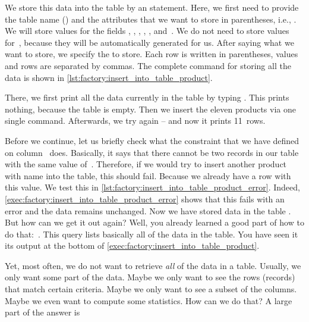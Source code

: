 We store this data into the table  by an  statement.
Here, we first need to provide the table name () and the attributes that we want to store in parentheses, i.e., .
We will store values for the fields , , , , , and~.
We do not need to store values for~, because they will be automatically generated for us.
After saying what we want to store, we specify the  to store.
Each row is written in parentheses, values and rows are separated by commas.
The complete command for storing all the data is shown in \cref{lst:factory:insert_into_table_product}.

There, we first print all the data currently in the table by typing \sqlIdx{*}.
This prints nothing, because the table is empty.
Then we insert the eleven products via one single  command.
Afterwards, we try \sqlIdx{*} again -- and now it prints 11~rows.

Before we continue, let us briefly check what the  constraint that we have defined on column~ does.
Basically, it says that there cannot be two records in our table with the same value of~.
Therefore, if we would try to insert another product with name  into the table, this should fail.
Because we already have a row with this value.
We test this in \cref{lst:factory:insert_into_table_product_error}.
Indeed, \cref{exec:factory:insert_into_table_product_error} shows that this fails with an error and the data remains unchanged.%
%
\endhsection%
%
%
%
Now we have stored data in the table .
But how can we get it out again?
Well, you already learned a good part of how to do that:~\sqlIdx{*}.
This query lists basically all of the data in the table.
You have seen it its output at the bottom of \cref{exec:factory:insert_into_table_product}.

Yet, most often, we do not want to retrieve \emph{all} of the data in a table.
Usually, we only want some part of the data.
Maybe we only want to see the rows (records) that match certain criteria.
Maybe we only want to see a subset of the columns.
Maybe we even want to compute some statistics.
How can we do that?
A large part of the answer is 

